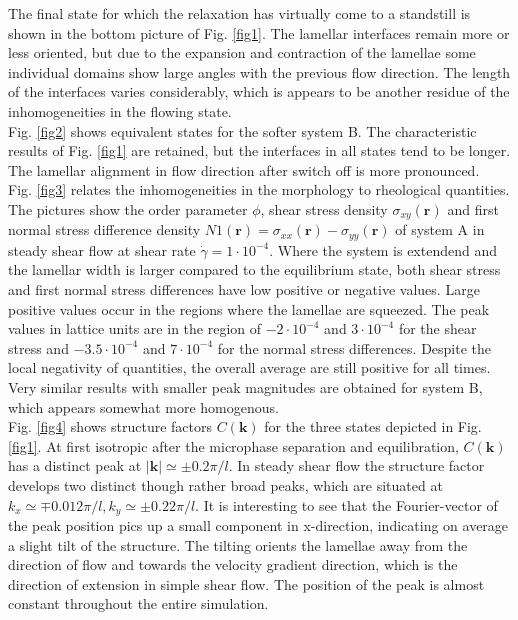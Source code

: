\documentclass[8.5pt,twoside,twocolumn]{article}
\newcommand{\e}[1]{\cdot10^{#1}}
\begin{document}
The final state for which the relaxation has virtually come to a standstill is shown in the bottom picture of Fig. \ref{fig1}. 
The lamellar interfaces remain more or less oriented, but due to the expansion and contraction of the lamellae some individual domains show large angles with the previous flow direction. 
The length of the interfaces varies considerably, which is appears to be another residue of the inhomogeneities in the flowing state.\\
Fig. \ref{fig2} shows equivalent states for the softer system B.
The characteristic results of Fig. \ref{fig1} are retained, but the interfaces in all states tend to be longer.
The lamellar alignment in flow direction after switch off is more pronounced.\\ 
Fig. \ref{fig3} relates the inhomogeneities in the morphology to rheological quantities.
The pictures show the order parameter $\phi$, shear stress density $\sigma_{xy}({\bm r})$ and first normal stress difference density $N1({\bm r})=\sigma_{xx}({\bm r})-\sigma_{yy}({\bm r})$ of system A in steady shear flow at shear rate $\dot{\gamma}=1\e{-4}$.
Where the system is extendend and the lamellar width is larger compared to the equilibrium state, both shear stress and first normal stress differences have low positive or negative values.
Large positive values occur in the regions where the lamellae are squeezed.
The peak values in lattice units are in the region of $-2\e{-4}$ and $3\e{-4}$ for the shear stress and  $-3.5\e{-4}$ and $7\e{-4}$ for the normal stress differences.
Despite the local negativity of quantities, the overall average are still positive for all times.
Very similar results with smaller peak magnitudes are obtained for system B, which appears somewhat more homogenous.\\
Fig. \ref{fig4} shows structure factors $C({\bm k})$ for the three states depicted in Fig. \ref{fig1}.
At first isotropic after the microphase separation and equilibration, $C({\bm k})$ has a distinct peak at $|{\bm k}|\simeq \pm0.2\pi/l$.
In steady shear flow the structure factor develops two distinct though rather broad peaks, which are situated at $k_x\simeq\mp 0.012\pi/l, k_y\simeq\pm 0.22 \pi/l$.
It is interesting to see that the Fourier-vector of the peak position pics up a small component in x-direction, indicating on average a slight tilt of the structure.
The tilting orients the lamellae away from the direction of flow and towards the velocity gradient direction, which is the direction of extension in simple shear flow.
The position of the peak is almost constant throughout the entire simulation.
\end{document}
